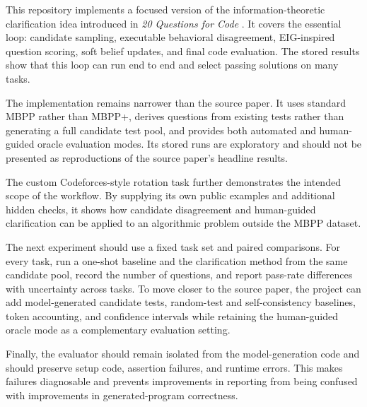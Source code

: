 This repository implements a focused version of the information-theoretic clarification idea introduced in \emph{20 Questions for Code} \cite{garg2026twenty}. It covers the essential loop: candidate sampling, executable behavioral disagreement, EIG-inspired question scoring, soft belief updates, and final code evaluation. The stored results show that this loop can run end to end and select passing solutions on many tasks.

The implementation remains narrower than the source paper. It uses standard MBPP rather than MBPP+, derives questions from existing tests rather than generating a full candidate test pool, and provides both automated and human-guided oracle evaluation modes. Its stored runs are exploratory and should not be presented as reproductions of the source paper's headline results.

The custom Codeforces-style rotation task further demonstrates the intended scope of the workflow. By supplying its own public examples and additional hidden checks, it shows how candidate disagreement and human-guided clarification can be applied to an algorithmic problem outside the MBPP dataset.

The next experiment should use a fixed task set and paired comparisons. For every task, run a one-shot baseline and the clarification method from the same candidate pool, record the number of questions, and report pass-rate differences with uncertainty across tasks. To move closer to the source paper, the project can add model-generated candidate tests, random-test and self-consistency baselines, token accounting, and confidence intervals while retaining the human-guided oracle mode as a complementary evaluation setting.

Finally, the evaluator should remain isolated from the model-generation code and should preserve setup code, assertion failures, and runtime errors. This makes failures diagnosable and prevents improvements in reporting from being confused with improvements in generated-program correctness.
